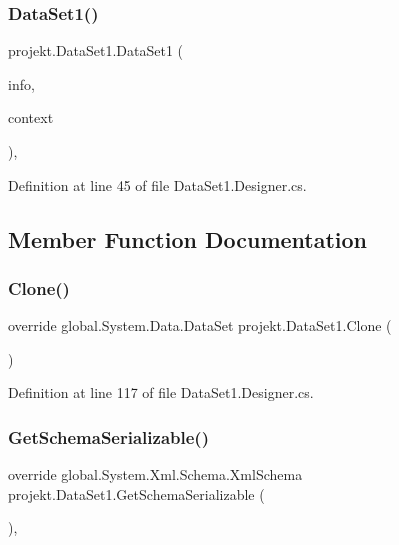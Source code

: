 \subsubsection{Data\+Set1()\hspace{0.1cm}{\footnotesize\ttfamily [2/2]}}
{\footnotesize\ttfamily projekt.\+Data\+Set1.\+Data\+Set1 (\begin{DoxyParamCaption}\item[{global\+::\+System.\+Runtime.\+Serialization.\+Serialization\+Info}]{info,  }\item[{global\+::\+System.\+Runtime.\+Serialization.\+Streaming\+Context}]{context }\end{DoxyParamCaption})\hspace{0.3cm}{\ttfamily [inline]}, {\ttfamily [protected]}}



Definition at line 45 of file Data\+Set1.\+Designer.\+cs.



\subsection{Member Function Documentation}
\mbox{\label{classprojekt_1_1DataSet1_a26f9dfcb33b30d3fc701574725273fd6}} 
\subsubsection{Clone()}
{\footnotesize\ttfamily override global.\+System.\+Data.\+Data\+Set projekt.\+Data\+Set1.\+Clone (\begin{DoxyParamCaption}{ }\end{DoxyParamCaption})\hspace{0.3cm}{\ttfamily [inline]}}



Definition at line 117 of file Data\+Set1.\+Designer.\+cs.

\mbox{\label{classprojekt_1_1DataSet1_a33a74f619d82064876ccb5caf72a83ff}} 
\subsubsection{Get\+Schema\+Serializable()}
{\footnotesize\ttfamily override global.\+System.\+Xml.\+Schema.\+Xml\+Schema projekt.\+Data\+Set1.\+Get\+Schema\+Serializable (\begin{DoxyParamCaption}{ }\end{DoxyParamCaption})\hspace{0.3cm}{\ttfamily [inline]}, {\ttfamily [protected]}}



